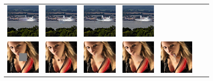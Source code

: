 \begin{figure}[!ht]
\begin{tabular}{ccccccc}
\includegraphics[width=.14\textwidth]{figures/imagenet/0165_nps2.jpg}&
\includegraphics[width=.14\textwidth]{figures/imagenet/imagenet_0165_siggraph2017.jpg}&
\includegraphics[width=.14\textwidth]{figures/imagenet/imagenet_0165_g.jpg}&
\includegraphics[width=.14\textwidth]{figures/imagenet/imagenet_0165_synthesized_image.jpg}\\
\includegraphics[width=.14\textwidth]{figures/imagenet/imagenet_0197_input_image.jpg}&
\includegraphics[width=.14\textwidth]{figures/imagenet/imagenet_0197_pm.jpg}&
\includegraphics[width=.14\textwidth]{figures/imagenet/0197_ce2.jpg}&
\includegraphics[width=.14\textwidth]{figures/imagenet/0197_nps2.jpg}&
\includegraphics[width=.14\textwidth]{figures/imagenet/imagenet_0197_siggraph2017.jpg}&

\end{tabular}
\end{figure}
